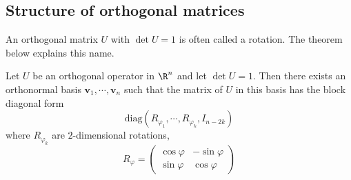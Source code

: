 \subsection{Structure of orthogonal matrices}
An orthogonal matrix $U$ with $\det U=1$ is often called a rotation. The theorem below explains this name.
\begin{theorem}\label{orthogonal det=1}
Let $U$ be an orthogonal operator in $\R^n$ and let $\det U=1$. Then there exists an orthonormal basis $\bm{v}_1,\cdots,\bm{v}_n$ such that the matrix of $U$ in this basis has the block diagonal form
\[\mathrm{diag}(R_{\varphi_1},\cdots,R_{\varphi_k},I_{n-2k})\]
where $R_{\varphi_k}$ are $2$-dimensional rotations,
\[R_{\varphi}=\begin{pmatrix}
\cos\varphi&-\sin\varphi\\
\sin\varphi&\cos\varphi
\end{pmatrix}\]
\end{theorem}
